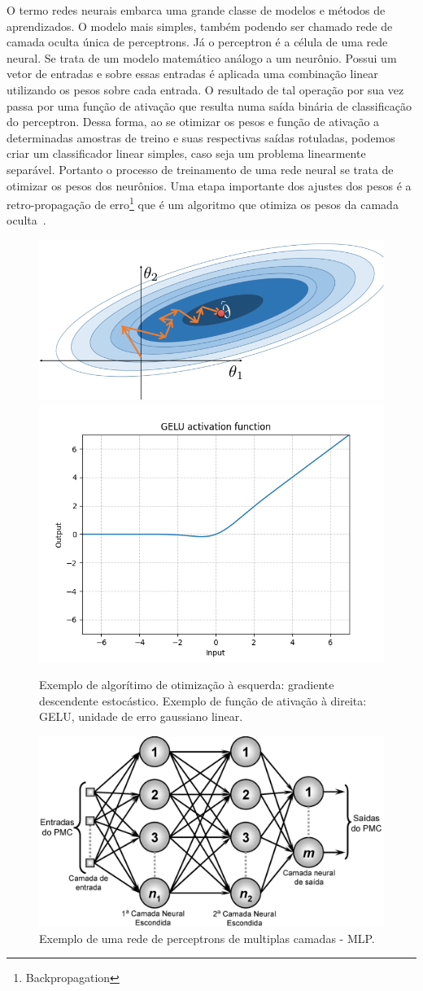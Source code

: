 O termo redes neurais embarca uma grande classe de modelos e métodos de aprendizados. O modelo mais simples, também podendo ser chamado rede de camada oculta única de perceptrons. Já o  perceptron é a célula de uma rede neural. Se trata de um modelo matemático análogo a um neurônio. Possui um vetor de entradas e sobre essas entradas é aplicada uma combinação linear utilizando os pesos sobre cada entrada. O resultado de tal operação por sua vez passa por uma função de ativação que resulta numa saída binária de classificação do perceptron. Dessa forma, ao se otimizar os pesos e função de ativação a determinadas amostras de treino e suas respectivas saídas rotuladas, podemos criar um classificador linear simples, caso seja um problema linearmente separável. Portanto o processo de treinamento de uma rede neural se trata de otimizar os pesos dos neurônios. Uma etapa importante dos ajustes dos pesos é a retro-propagação de erro\footnote{Backpropagation} que é um algoritmo que otimiza os pesos da camada oculta~\cite{hastie01statisticallearning}.

\begin{figure}[!ht]
    \centering
    \includegraphics[width=0.47\columnwidth]{
        Imagens/stochastic_gradient_descent.PNG
    }
    \includegraphics[width=0.47\columnwidth]{
        Imagens/GELU.PNG
    }
    \caption{Exemplo de algorítimo de otimização à esquerda: gradiente descendente estocástico. Exemplo de função de ativação à direita: GELU, unidade de erro gaussiano linear.}
    \label{fig:SGD_GELU}
\end{figure}


\begin{figure}[!ht]
    \centering
    \includegraphics[width=0.6\columnwidth]{
        Imagens/RedeNeural.PNG
    }
    \caption{Exemplo de uma rede de perceptrons de multiplas camadas - MLP.}
    \label{fig:ann}
\end{figure}
